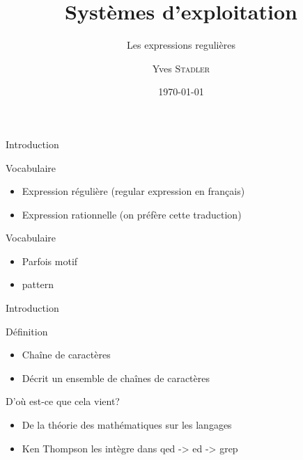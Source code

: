 
\title{Systèmes d'exploitation}
\subtitle{Les expressions regulières}

\author{Yves \textsc{Stadler}}

\date{\today}




\begin{frame}
\titlepage
\end{frame}

\def\sectitle{Introduction}
\def\subsectitle{Vocabulaire}

\begin{frame}{\sectitle}
\begin{block}{\subsectitle}
    \begin{itemize}
        \item Expression régulière (regular expression en français)
        \item Expression rationnelle (on préfère cette traduction)
    \end{itemize}
\end{block}

\begin{block}{\subsectitle}
    \begin{itemize}
        \item Parfois motif
        \item pattern
    \end{itemize}
\end{block}

\end{frame}



\def\subsectitle{Définition}
\begin{frame}{\sectitle}
    \begin{block}{\subsectitle}
        \begin{itemize}
            \item Chaîne de caractères
            \item Décrit un ensemble de chaînes de caractères
    \end{itemize}
\end{block}

\def\subsectitle{D'où est-ce que cela vient?}
\begin{block}{\subsectitle}
    \begin{itemize}
        \item De la théorie des mathématiques sur les langages
        \item Ken Thompson les intègre dans qed -> ed -> grep
    \end{itemize}
\end{block}
\end{frame}

